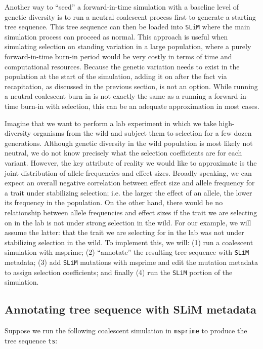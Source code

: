 \documentclass[12pt]{article}
\newcommand{\msprime}[0]{\texttt{msprime}\xspace}
\newcommand{\slim}[0]{\texttt{SLiM}\xspace}
\begin{document}
Another way to ``seed'' a forward-in-time simulation with a baseline level of genetic diversity
is to run a neutral coalescent process first to generate a starting tree sequence. This tree sequence
can then be loaded into \slim where the main simulation process can proceed as normal. This
approach is useful when simulating selection on standing variation in a large population, where
a purely forward-in-time burn-in period would be very costly in terms of time and computational resources.
Because the genetic variation needs to exist in the population at the start of the simulation, adding
it on after the fact via recapitation, as discussed in the previous section, is not an option. While running
a neutral coalescent burn-in is not exactly the same as a running a forward-in-time burn-in with selection,
this can be an adequate approximation in most cases. %

Imagine that we want to perform a lab experiment in which we take high-diversity
organisms from the wild and subject them to selection for a few dozen generations.
Although genetic diversity in the wild population is most likely not neutral,
we do not know precisely what the selection coefficients are for each variant.
However, the key attribute of reality we would like to approximate is the joint distribution of
allele frequencies and effect sizes. Broadly speaking, we can expect an overall negative correlation
between effect size and allele frequency for a trait under stabilizing selection; i.e. the larger
the effect of an allele, the lower its frequency in the population.
On the other hand, there would be no relationship between allele frequencies and effect sizes
if the trait we are selecting on in the lab is not under strong selection in the wild.
For our example, we will assume the latter: that the trait we are selecting for in the lab was
not under stabilizing selection in the wild. To implement this, we will:
(1) run a coalescent simulation with msprime;
(2) ``annotate'' the resulting tree sequence with \slim metadata;
(3) add \slim mutations with msprime
        and edit the mutation metadata to assign selection coefficients; and finally
(4) run the \slim portion of the simulation.

\subsection*{Annotating tree sequence with SLiM metadata}

Suppose we run the following coalescent simulation in \msprime to produce the tree sequence \verb|ts|:
\end{document}
